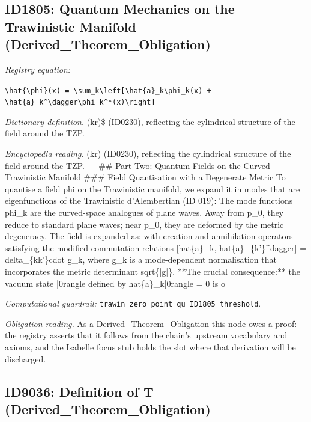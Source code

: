 \documentclass[11pt]{article}
\theoremstyle{remark}
\begin{document}
\subsection{ID1805: Quantum Mechanics on the Trawinistic Manifold (Derived\_Theorem\_Obligation)}

\noindent\textit{Registry equation:}\par
{\small\texttt{\textbackslash{}hat\{\textbackslash{}phi\}(x) = \textbackslash{}sum\_k\textbackslash{}left[\textbackslash{}hat\{a\}\_k\textbackslash{}phi\_k(x) + \textbackslash{}hat\{a\}\_k\textasciicircum{}\textbackslash{}dagger\textbackslash{}phi\_k\textasciicircum{}*(x)\textbackslash{}right]}}\par\medskip
\noindent\textit{Dictionary definition.} (kr)\$ (ID0230), reflecting the cylindrical structure of the field around the TZP.\par\medskip
\noindent\textit{Encyclopedia reading.} (kr) (ID0230), reflecting the cylindrical structure of the field around the TZP. --- \#\# Part Two: Quantum Fields on the Curved Trawinistic Manifold \#\#\# Field Quantisation with a Degenerate Metric To quantise a field phi on the Trawinistic manifold, we expand it in modes that are eigenfunctions of the Trawinistic d'Alembertian (ID 019): The mode functions phi\_k are the curved-space analogues of plane waves. Away from p\_0, they reduce to standard plane waves; near p\_0, they are deformed by the metric degeneracy. The field is expanded as: with creation and annihilation operators satisfying the modified commutation relations [hat\{a\}\_k, hat\{a\}\_\{k'\}\textasciicircum{}dagger] = delta\_\{kk'\}cdot g\_k, where g\_k is a mode-dependent normalisation that incorporates the metric determinant sqrt\{|g|\}. **The crucial consequence:** the vacuum state |0rangle defined by hat\{a\}\_k|0rangle = 0 is o
\par\medskip\noindent\textit{Computational guardrail:} \texttt{trawin\_zero\_point\_qu\_ID1805\_threshold}.
\par\medskip\noindent\textit{Obligation reading.} As a Derived\_Theorem\_Obligation this node owes a proof: the registry asserts that it follows from the chain's upstream vocabulary and axioms, and the Isabelle focus stub holds the slot where that derivation will be discharged.

\subsection{ID9036: Definition of T (Derived\_Theorem\_Obligation)}
\end{document}

